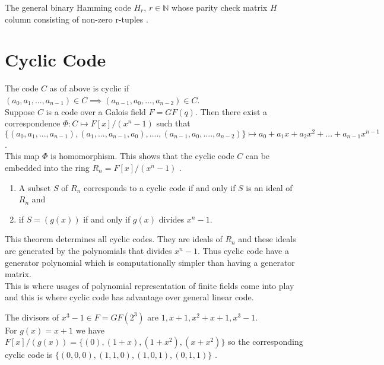 \begin{example}
  The general binary Hamming code \(H_r\), \(r \in \mathbb{N}\) whose parity check matrix \(H\) column consisting of non-zero r-tuples \cite{error_correct}.
\end{example}

\section{Cyclic Code}
The code \(C\) as of above is cyclic if \((a_0,a_1,...,a_{n-1}) \in C \implies (a_{n-1},a_0,...,a_{n-2}) \in C\).\\

Suppose \(C\) is a code over a Galois field \(F=GF(q)\). Then there exist a correspondence \(\Phi : C \mapsto F[x]/(x^n-1)\) such that \(\{(a_0,a_1,...,a_{n-1}),(a_1,...,a_{n-1},a_0),....,(a_{n-1},a_0,....,a_{n-2})\} \longmapsto a_0+a_1x+a_2x^2+...+a_{n-1}x^{n-1}\). \\

This map \(\Phi\) is homomorphism. This shows that the cyclic code \(C\) can be embedded into the ring \(R_n=F[x]/(x^n-1)\) \cite{error_correct}.
\vspace{5mm}
\begin{theorem} \cite{error_correct}
  \begin{enumerate}
  \item A subset \(S\) of \(R_n\) corresponds to a cyclic code if and only if \(S\) is an ideal of \(R_n\) and
  \item if \(S=(g(x))\) if and only if  \(g(x)\) divides \(x^n-1\).
  \end{enumerate}
\end{theorem}

\begin{tcolorbox}
  This theorem determines all cyclic codes. They are ideals of \(R_n\) and these ideals are generated by the polynomials that divides \(x^n-1\). Thus cyclic code have a generator polynomial which is computationally simpler than having a generator matrix. \\[2mm]
  This is where usages of polynomial representation of finite fields come into play and this is where cyclic code has advantage over general linear code.
\end{tcolorbox}

\vspace{5mm}
\begin{example}
  The divisors of \(x^3-1 \in F=GF(2^{3})\) are \(1, x+1, x^2+x+1, x^3-1\).\\
  For \(g(x)=x+1\) we have \(F[x]/(g(x))=\{(0),(1+x),(1+x^2),(x+x^2)\}\) so the corresponding cyclic code is \(\{(0,0,0),(1,1,0),(1,0,1),(0,1,1)\}\) \cite{error_correct}.
\end{example}

